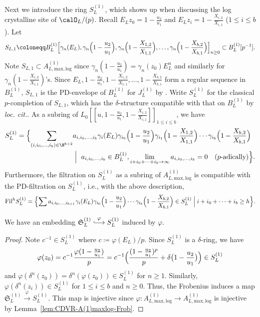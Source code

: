 Next we introduce the ring $S_L^{(1)}$, which shows up when discussing the log crystalline site of $\calO_L/(p)$. Recall $E_L z_0=1-\frac{u_2}{u_1}$ and $E_L z_i=1-\frac{X_{i, 2}}{X_{i, 1}}$ ($1\leq i\leq b$). Let 
\[
S_{L, 1} \coloneqq B_L^{(1)}\Bigl[\gamma_n(E_L), \gamma_n\Bigl(1-\frac{u_2}{u_1}\Bigr), \gamma_n\Bigl(1-\frac{X_{1, 2}}{X_{1, 1}}\Bigr),\ldots,\gamma_n\Bigl(1-\frac{X_{b, 2}}{X_{b, 1}}\Bigr)\Bigr]_{n\geq 0} \subset B_L^{(1)}[p^{-1}].
\]
Note $S_{L, 1} \subset A^{(1)}_{L, \mathrm{max, log}}$ since $\gamma_n(1-\frac{u_2}{u_1}) = \gamma_n(z_0)E_L^n$ and similarly for $\gamma_n(1-\frac{X_{i, 2}}{X_{i, 1}})$'s. Since $E_L, 1-\frac{u_2}{u_1}, 1-\frac{X_{1, 2}}{X_{1, 1}}, \ldots, 1-\frac{X_{b, 2}}{X_{b, 1}}$ form a regular sequence in $B_L^{(1)}$, $S_{L, 1}$ is the PD-envelope of $B_L^{(1)}$ for $J_L^{(1)}$ by \cite[Cor.~2.39]{bhatt-scholze-prismaticcohom}. Write $S_L^{(1)}$ for the classical $p$-completion of $S_{L, 1}$, which has the $\delta$-structure compatible with that on $B_L^{(1)}$ by \textit{loc. cit.}. As a subring of $L_0[\![u, 1-\frac{u_2}{u_1}, 1-\frac{X_{i, 2}}{X_{i, 1}}]\!]_{1 \leq i \leq b}$, we have 
\begin{align*}
S_L^{(1)} = \Bigl\{\sum_{(i,i_0, \ldots, i_{b})\in \N^{b+2}} &a_{i,i_0, \ldots, i_b} \gamma_{i}(E_L)\gamma_{i_0}\Bigl(1-\frac{u_2}{u_1}\Bigr)\gamma_{i_{1}}\Bigl(1-\frac{X_{1, 2}}{X_{1, 1}}\Bigr)\cdots\gamma_{i_{b}}\Bigl(1-\frac{X_{b, 2}}{X_{b, 1}}\Bigr) \\
&\Bigm|~ a_{i,i_0, \ldots, i_b} \in  B_L^{(1)},\lim_{i+i_0+\cdots+ i_{b} \to \infty} a_{i,i_0, \ldots, i_b} = 0 \quad(\text{$p$-adically})\Bigr\}.
\end{align*}
Furthermore, the filtration on $S_L^{(1)}$ as a subring of $A^{(1)}_{L, \mathrm{max, log}}$ is compatible with the PD-filtration on $S_L^{(1)}$, i.e., with the above description, 
\[
\mathrm{Fil}^h S_L^{(1)} = \Bigl\{\sum a_{i,i_0, \ldots, i_{b+1}} \gamma_{i}(E_L)\gamma_{i_0}\Bigl(1-\frac{u_2}{u_1}\Bigr)\cdots\gamma_{i_{b}}\Bigl(1-\frac{X_{b, 2}}{X_{b, 1}}\Bigr)\in S_L^{(1)} \Bigm| i+i_0+\cdots+i_{b} \geq h\Bigr\}.
\]

\begin{lem} \label{lem:CDVR-frakS^(1)-to-S^(1)}
We have an embedding $\mathfrak{S}_L^{(1)} \stackrel{\varphi}{\lhook\joinrel\longrightarrow} S_L^{(1)}$ induced by $\varphi$.   
\end{lem}

\begin{proof}
Note $c^{-1} \in S_L^{(1)}$ where $c \coloneqq \varphi(E_L)/p$. Since $S_L^{(1)}$ is a $\delta$-ring, we have
\[
\varphi(z_0) = c^{-1}\frac{\varphi(1-\frac{u_2}{u_1})}{p} = c^{-1}\Bigl(\frac{(1-\frac{u_2}{u_1})^p}{p}+\delta\bigl(1-\frac{u_2}{u_1}\bigr)\Bigr) \in S_L^{(1)}
\]
and $\varphi(\delta^n(z_0)) = \delta^n(\varphi(z_0)) \in S_L^{(1)}$ for $n \geq 1$. Similarly, $\varphi(\delta^n(z_i)) \in S_L^{(1)}$ for $1 \leq i \leq b$ and $n \geq 0$. Thus, the Frobenius induces a map $\mathfrak{S}_L^{(1)} \stackrel{\varphi}{\longrightarrow} S_L^{(1)}$. This map is injective since $\varphi\colon A^{(1)}_{L, \mathrm{max, log}} \rightarrow A^{(1)}_{L, \mathrm{max, log}}$ is injective by Lemma~\ref{lem:CDVR-A(1)maxlog-Frob}.
\end{proof}


